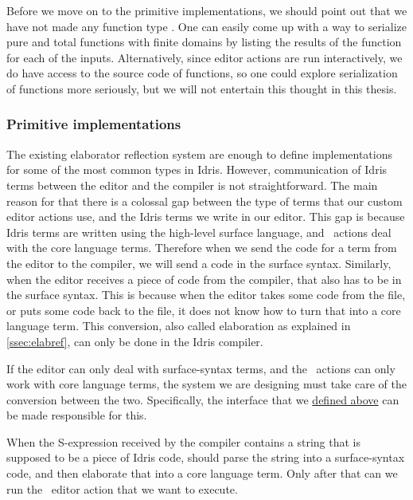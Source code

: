Before we move on to the primitive  implementations,
we should point out that we have not made any function type .
One can easily come up with a way to serialize pure and total functions with
finite domains by listing the results of the function for each of the inputs.
Alternatively, since editor actions are run interactively, we do have access to
the source code of functions, so one could explore serialization of functions
more seriously, but we will not entertain this thought in this thesis.

\subsubsection{Primitive  implementations}\label{sssec:primitiveEditorable}

The existing elaborator reflection system are enough to define 
implementations for some of the most common types in Idris.
However, communication of Idris terms between the editor and the compiler is
not straightforward. The main reason for that there is a colossal gap between
the type of terms that our custom editor actions use, and the Idris terms we
write in our editor.
This gap is because Idris terms are written using the high-level surface
language, and \Elab\ actions deal with the core language terms. Therefore when
we send the code for a term from the editor to the compiler, we will send a
code in the surface syntax. Similarly, when the editor receives a piece of code
from the compiler, that also has to be in the surface syntax. This is because
when the editor takes some code from the file, or puts some code back to the
file, it does not know how to turn that into a core language term.
This conversion, also called elaboration as explained in
\autoref{ssec:elabref}, can only be done in the Idris compiler.

If the editor can only deal with surface-syntax terms, and the \Elab\ actions
can only work with core language terms, the system we are designing must take
care of the conversion between the two.
Specifically, the  interface that we
\hyperref[code:editorable]{defined above} can be made responsible for this.

When the S-expression received by the compiler contains a string that is
supposed to be a piece of Idris code,  should parse the string
into a surface-syntax code, and then elaborate that into a core language term.
Only after that can we run the \Elab\ editor action that we want to execute.

